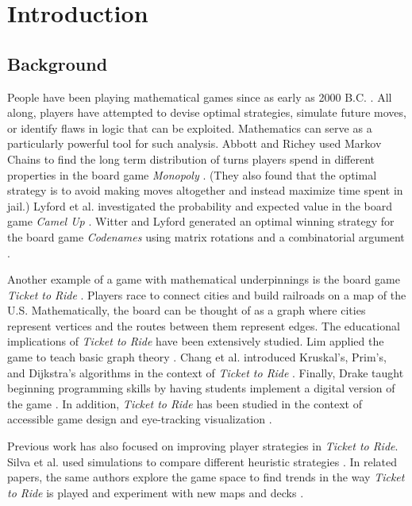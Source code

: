 \section{Introduction}
\subsection{Background}
People have been playing mathematical games
since as early as 2000 B.C.
\cite{cornelius1986historical}.
All along,
players have attempted to devise optimal
strategies, simulate future moves, or identify
flaws in logic that can be exploited.
Mathematics can serve as a particularly powerful tool for
such analysis.
Abbott and Richey used Markov Chains
to find the long term 
distribution of turns players spend in different
properties in the board game
\textit{Monopoly} \cite{abbott1997take, magie1935}.
(They also found that the optimal strategy is to avoid making
moves altogether and instead maximize time spent in jail.)
Lyford et al. investigated the probability and expected value 
in the board game \textit{Camel Up}
\cite{bogen2014, lyford2019using}.
Witter and Lyford generated an optimal winning strategy for the 
board game \textit{Codenames} using matrix rotations
and a combinatorial argument \cite{chvatil2015}.

Another example of a game with mathematical underpinnings is
the board game \textit{Ticket to Ride} \cite{moon2004ticket}. 
Players race to connect 
cities and build railroads on a map of the U.S.
Mathematically, the board
can be thought of as a graph where
cities represent vertices and the
routes between them represent edges.
The educational implications of \textit{Ticket to Ride}
have been extensively studied.
Lim applied the game to teach basic graph theory
\cite{lim2007taking}.
Chang et al. introduced Kruskal's, Prim's, and Dijkstra's
algorithms in the context of \textit{Ticket to Ride}
\cite{chang2008learning}.
Finally, Drake taught beginning programming skills by having
students implement a digital version 
of the game \cite{drake2011teaching}.
In addition, \textit{Ticket to Ride} 
has been studied in the context of
accessible game design and eye-tracking visualization
\cite{eriksson2005enhancing, newn2017evaluating}.

Previous work has also focused on improving player 
strategies in \textit{Ticket to Ride}.
Silva et al. used simulations to compare different
heuristic strategies \cite{de2017playtesting}.
In related papers, the same authors explore the 
game space to find trends in the way \textit{Ticket to Ride}
is played and experiment with new maps and decks 
\cite{de2017evaluator, de2018evolving}.

